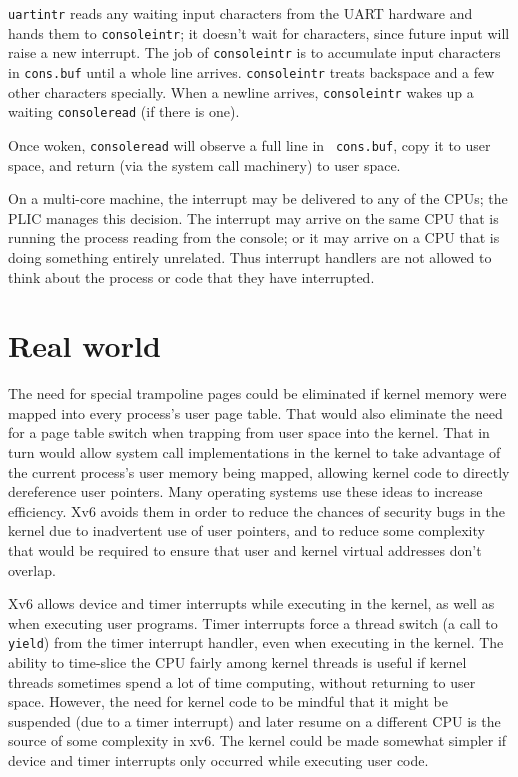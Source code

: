 {\tt uartintr}
reads any waiting input characters from the UART hardware
and hands them to {\tt consoleintr}; it doesn't
wait for characters, since future input will raise a new interrupt.
The job of {\tt consoleintr} is to accumulate input characters in
{\tt cons.buf} 
until a whole line arrives.
{\tt consoleintr} treats backspace and a few other characters
specially.
When a newline arrives, {\tt consoleintr} wakes up a
waiting {\tt consoleread} (if there is one).

Once woken, {\tt consoleread} will observe a full line in {\tt
  cons.buf}, copy it to user space, and return (via the system call
machinery) to user space.

On a multi-core machine, the interrupt may be delivered to any of the
CPUs; the PLIC manages this decision. The interrupt may arrive on the
same CPU that is running the process reading from the console; or it
may arrive on a CPU that is doing something entirely unrelated. Thus
interrupt handlers are not allowed to think about the process or code
that they have interrupted.

\section{Real world}

The need for special trampoline pages could be eliminated if kernel
memory were mapped into every process's user page table. That would
also eliminate the need for a page table switch when trapping from
user space into the kernel. That in turn would allow system call
implementations in the kernel to take advantage of the current
process's user memory being mapped, allowing kernel code to directly
dereference user pointers. Many operating systems use these ideas to
increase efficiency. Xv6 avoids them in order to reduce the chances of
security bugs in the kernel due to inadvertent use of user pointers,
and to reduce some complexity that would be required to ensure that
user and kernel virtual addresses don't overlap.

Xv6 allows device and timer interrupts while executing in the kernel,
as well as when executing user programs. Timer interrupts force a
thread switch (a call to {\tt yield}) from the timer interrupt
handler, even when executing in the kernel. The ability to time-slice
the CPU fairly among kernel threads is useful if kernel threads
sometimes spend a lot of time computing, without returning to user
space. However, the need for kernel code to be mindful that it might
be suspended (due to a timer interrupt) and later resume on a
different CPU is the source of some complexity in xv6. The kernel
could be made somewhat simpler if device and timer interrupts only
occurred while executing user code.

